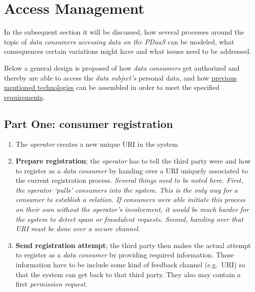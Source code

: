 \documentclass[12pt,english,a4paper,titlepage,cleardoublepage=empty,dottedtoc]{report}
\begin{document}
\section{Access Management}\label{access-management}

In the subsequent section it will be discussed, how several processes
around the topic of \emph{data consumers accessing data on the PDaaS}
can be modeled, what consequences certain variations might have and what
issues need to be addressed.

Below a general design is proposed of how \emph{data consumers} get
authorized and thereby are able to access the \emph{data subject's}
personal data, and how
\protect\hyperlink{standards-specifications-and-related-technologies}{previous
mentioned technologies} can be assembled in order to meet the specified
\protect\hyperlink{requirements}{requirements}.

\subsection*{Part One: consumer
registration}\label{part-one-consumer-registration}

\begin{enumerate}
\def\labelenumi{\arabic{enumi})}
\setcounter{enumi}{-1}
\item
  The \emph{operator} creates a new unique URI in the system
\item
  \textbf{Prepare registration}; the \emph{operator} has to tell the
  third party were and how to register as a \emph{data consumer} by
  handing over a URI uniquely associated to the current registration
  process. \emph{Several things need to be noted here. First, the
  operator `pulls' consumers into the system. This is the only way for a
  consumer to establish a relation. If consumers were able initiate this
  process on their own without the operator's involvement, it would be
  much harder for the system to detect spam or fraudulent requests.
  Second, handing over that URI must be done over a secure channel.}
\item
  \textbf{Send registration attempt}; the third party then makes the
  actual attempt to register as a \emph{data consumer} by providing
  required information. Those information have to be include some kind
  of feedback channel (e.g.~URI) so that the system can get back to that
  third party. They also may contain a first \emph{permission request}.
\end{enumerate}
\end{document}
